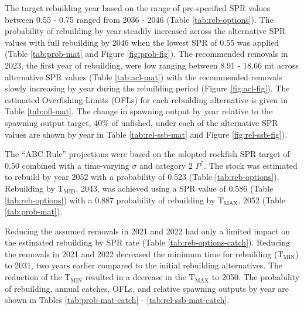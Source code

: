 \documentclass[11pt,
  english,
  a4paper,
]{article}
\begin{document}

The target rebuilding year based on the range of pre-specified SPR values between 0.55 - 0.75 ranged from 2036 - 2046 (Table \ref{tab:reb-options}). The probability of rebuilding by year steadily increased across the alternative SPR values with full rebuilding by 2046 when the lowest SPR of 0.55 was applied (Table \ref{tab:prob-mat} and Figure \ref{fig:prob-fig}). The recommended removals in 2023, the first year of rebuilding, were low ranging between 8.91 - 18.66 mt across alternative SPR values (Table \ref{tab:acl-mat}) with the recommended removals slowly increasing by year during the rebuilding period (Figure \ref{fig:acl-fig}). The estimated Overfishing Limits (OFLs) for each rebuilding alternative is given in Table \ref{tab:ofl-mat}. The change in spawning output by year relative to the spawning output target, 40\% of unfished, under each of the alternative SPR values are shown by year in Table \ref{tab:rel-ssb-mat} and Figure \ref{fig:rel-ssb-fig}).

\leavevmode\tagmcend\tagstructend\par


The ``ABC Rule'' projections were based on the adopted rockfish SPR target of 0.50 combined with a time-varying {\(\sigma\)\leavevmode\tagmcend\tagstructend} and category 2 {\(P^*\)\leavevmode\tagmcend\tagstructend}. The stock was estimated to rebuild by year 2052 with a probability of 0.523 (Table \ref{tab:reb-options}). Rebuilding by {\(\text{T}_\text{MID}\)\leavevmode\tagmcend\tagstructend}, 2043, was achieved using a SPR value of 0.586 (Table \ref{tab:reb-options}) with a 0.887 probability of rebuilding by {\(\text{T}_\text{MAX}\)\leavevmode\tagmcend\tagstructend}, 2052 (Table \ref{tab:prob-mat}).

\leavevmode\tagmcend\tagstructend\par


Reducing the assumed removals in 2021 and 2022 had only a limited impact on the estimated rebuilding by SPR rate (Table \ref{tab:reb-options-catch}). Reducing the removals in 2021 and 2022 decreased the minimum time for rebuilding ({\(\text{T}_\text{MIN}\)\leavevmode\tagmcend\tagstructend}) to 2031, two years earlier compared to the initial rebuilding alternatives. The reduction of the {\(\text{T}_\text{MIN}\)\leavevmode\tagmcend\tagstructend} resulted in a decrease in the {\(\text{T}_\text{MAX}\)\leavevmode\tagmcend\tagstructend} to 2050. The probability of rebuilding, annual catches, OFLs, and relative spawning outputs by year are shown in Tables \ref{tab:prob-mat-catch} - \ref{tab:rel-ssb-mat-catch}.
\end{document}
